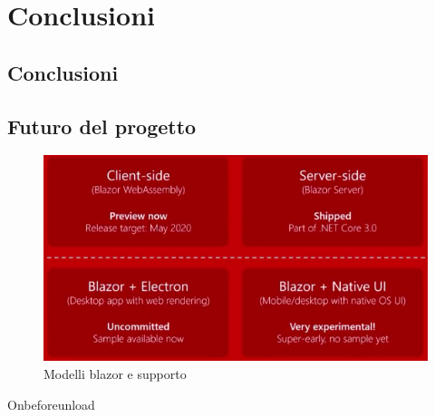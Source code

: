 \chapter{Conclusioni}\label{cap:conclusioni}
\section{Conclusioni}\label{sez:conclusioni}
\section{Futuro del progetto}\label{sez:futuro}
\begin{figure}[H]
	\centerline{\includegraphics[scale=0.8]{figure/ModelsSupportedOrNot.png}}
	\caption{Modelli blazor e supporto}
	\label{fig:supportedBlazorModels}
\end{figure}

Onbeforeunload